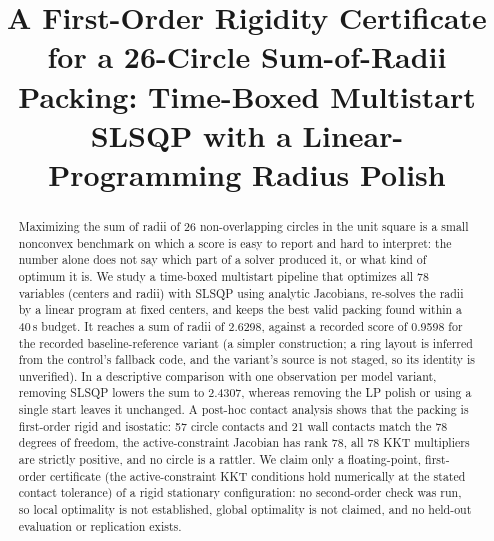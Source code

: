 \documentclass{article} %
\title{A First-Order Rigidity Certificate for a 26-Circle Sum-of-Radii Packing: Time-Boxed Multistart SLSQP with a Linear-Programming Radius Polish}
\begin{document}
\maketitle

\begin{abstract}
Maximizing the sum of radii of 26 non-overlapping circles in the unit square is a small nonconvex benchmark on which a score is easy to report and hard to interpret: the number alone does not say which part of a solver produced it, or what kind of optimum it is.
We study a time-boxed multistart pipeline that optimizes all 78 variables (centers and radii) with SLSQP using analytic Jacobians, re-solves the radii by a linear program at fixed centers, and keeps the best valid packing found within a 40\,s budget.
It reaches a sum of radii of 2.6298, against a recorded score of 0.9598 for the recorded baseline-reference variant (a simpler construction; a ring layout is inferred from the control's fallback code, and the variant's source is not staged, so its identity is unverified).
In a descriptive comparison with one observation per model variant, removing SLSQP lowers the sum to 2.4307, whereas removing the LP polish or using a single start leaves it unchanged.
A post-hoc contact analysis shows that the packing is first-order rigid and isostatic: 57 circle contacts and 21 wall contacts match the 78 degrees of freedom, the active-constraint Jacobian has rank 78, all 78 KKT multipliers are strictly positive, and no circle is a rattler.
We claim only a floating-point, first-order certificate (the active-constraint KKT conditions hold numerically at the stated contact tolerance) of a rigid stationary configuration: no second-order check was run, so local optimality is not established, global optimality is not claimed, and no held-out evaluation or replication exists.
\end{abstract}
\end{document}
